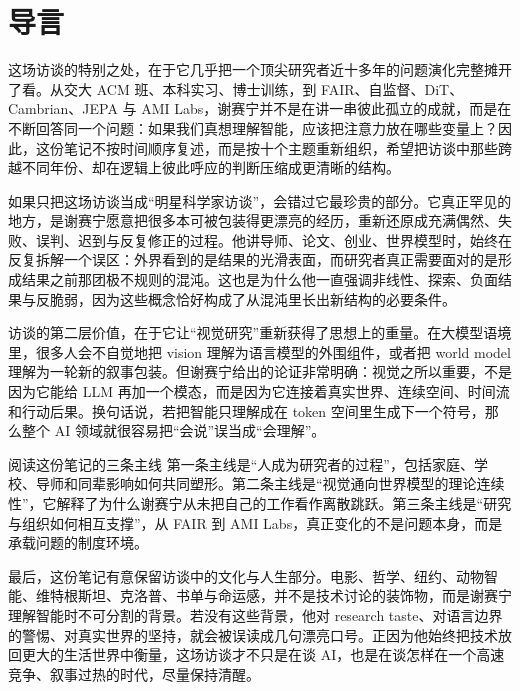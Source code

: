 \section*{导言}

这场访谈的特别之处，在于它几乎把一个顶尖研究者近十多年的问题演化完整摊开了看。从交大 ACM 班、本科实习、博士训练，到 FAIR、自监督、DiT、Cambrian、JEPA 与 AMI Labs，谢赛宁并不是在讲一串彼此孤立的成就，而是在不断回答同一个问题：如果我们真想理解智能，应该把注意力放在哪些变量上？因此，这份笔记不按时间顺序复述，而是按十个主题重新组织，希望把访谈中那些跨越不同年份、却在逻辑上彼此呼应的判断压缩成更清晰的结构。

如果只把这场访谈当成“明星科学家访谈”，会错过它最珍贵的部分。它真正罕见的地方，是谢赛宁愿意把很多本可被包装得更漂亮的经历，重新还原成充满偶然、失败、误判、迟到与反复修正的过程。他讲导师、论文、创业、世界模型时，始终在反复拆解一个误区：外界看到的是结果的光滑表面，而研究者真正需要面对的是形成结果之前那团极不规则的混沌。这也是为什么他一直强调非线性、探索、负面结果与反脆弱，因为这些概念恰好构成了从混沌里长出新结构的必要条件。

访谈的第二层价值，在于它让“视觉研究”重新获得了思想上的重量。在大模型语境里，很多人会不自觉地把 vision 理解为语言模型的外围组件，或者把 world model 理解为一轮新的叙事包装。但谢赛宁给出的论证非常明确：视觉之所以重要，不是因为它能给 LLM 再加一个模态，而是因为它连接着真实世界、连续空间、时间流和行动后果。换句话说，若把智能只理解成在 token 空间里生成下一个符号，那么整个 AI 领域就很容易把“会说”误当成“会理解”。

\begin{importantbox}{阅读这份笔记的三条主线}
第一条主线是“人成为研究者的过程”，包括家庭、学校、导师和同辈影响如何共同塑形。第二条主线是“视觉通向世界模型的理论连续性”，它解释了为什么谢赛宁从未把自己的工作看作离散跳跃。第三条主线是“研究与组织如何相互支撑”，从 FAIR 到 AMI Labs，真正变化的不是问题本身，而是承载问题的制度环境。
\end{importantbox}

最后，这份笔记有意保留访谈中的文化与人生部分。电影、哲学、纽约、动物智能、维特根斯坦、克洛普、书单与命运感，并不是技术讨论的装饰物，而是谢赛宁理解智能时不可分割的背景。若没有这些背景，他对 research taste、对语言边界的警惕、对真实世界的坚持，就会被误读成几句漂亮口号。正因为他始终把技术放回更大的生活世界中衡量，这场访谈才不只是在谈 AI，也是在谈怎样在一个高速竞争、叙事过热的时代，尽量保持清醒。

